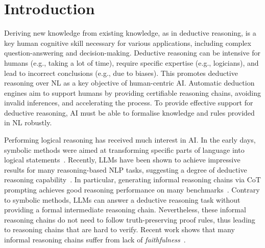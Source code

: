 \section{Introduction}
\label{sec:introduction}

Deriving new knowledge from existing knowledge, as in deductive reasoning, is a key human cognitive skill necessary for various applications, including complex question-answering and decision-making. Deductive reasoning can be intensive for humans (e.g., taking a lot of time), require specific expertise (e.g., logicians), and lead to incorrect conclusions (e.g., due to biases). This promotes deductive reasoning over \ac{NL} as a key objective of human-centric AI. Automatic deduction engines aim to support humans by providing certifiable reasoning chains, avoiding invalid inferences, and accelerating the process. To provide effective support for deductive reasoning, AI must be able to formalise knowledge and rules provided in \ac{NL} robustly.

Performing logical reasoning has received much interest in AI. In the early days, symbolic methods were aimed at transforming specific parts of language into logical statements~\cite{pereira1982logic}. Recently, \acp{LLM} have been shown to achieve impressive results for many reasoning-based \ac{NLP} tasks, suggesting a degree of deductive reasoning capability~\cite{srivastava2023beyond}. In particular, generating informal reasoning chains via \ac{CoT} prompting achieves good reasoning performance on many benchmarks~\cite{wei_chain_2022}. Contrary to symbolic methods, \acp{LLM} can answer a deductive reasoning task without providing a formal intermediate reasoning chain. Nevertheless, these informal reasoning chains do not need to follow truth-preserving proof rules, thus leading to reasoning chains that are hard to verify. Recent work shows that many informal reasoning chains suffer from lack of \textit{faithfulness}~\cite{ye_unreliability_2022,tanneru_difficulty_2024}. 


